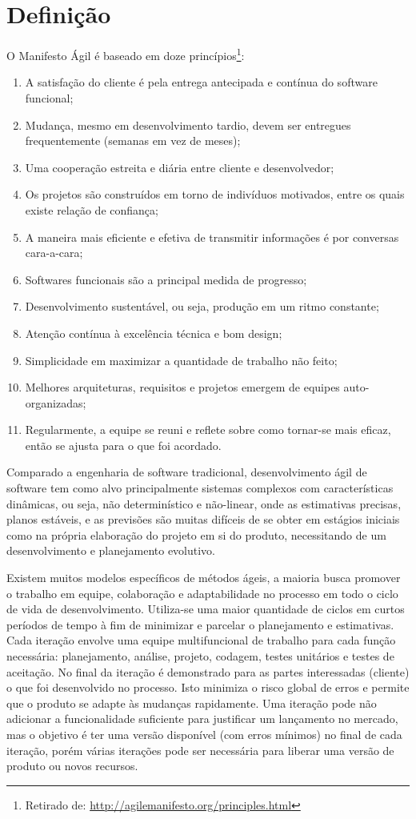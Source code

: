 \section{Definição}
\par O Manifesto Ágil é baseado em doze princípios\footnote{ Retirado de: \url{http://agilemanifesto.org/principles.html}}:
\begin{enumerate}
  \item A satisfação do cliente é pela entrega antecipada e contínua do software funcional;
  \item Mudança, mesmo em desenvolvimento tardio, devem ser entregues frequentemente (semanas em vez de meses);
  \item Uma cooperação estreita e diária entre cliente e desenvolvedor;
  \item Os projetos são construídos em torno de indivíduos motivados, entre os quais existe relação de confiança;
  \item A maneira mais eficiente e efetiva de transmitir informações é por conversas cara-a-cara;
  \item Softwares funcionais são a principal medida de progresso;
  \item Desenvolvimento sustentável, ou seja, produção em um ritmo constante;
  \item Atenção contínua à excelência técnica e bom design;
  \item Simplicidade em maximizar a quantidade de trabalho não feito;
  \item Melhores arquiteturas, requisitos e projetos emergem de equipes auto-organizadas;
  \item Regularmente, a equipe se reuni e reflete sobre como tornar-se mais eficaz, então se ajusta para o que foi acordado.
\end{enumerate}
\par Comparado a engenharia de software tradicional, desenvolvimento ágil de software tem como alvo principalmente sistemas complexos com características dinâmicas, ou seja, não determinístico e não-linear, onde as estimativas precisas, planos estáveis, e as previsões são muitas difíceis de se obter em estágios iniciais como na própria elaboração do projeto em si do produto, necessitando de um desenvolvimento e planejamento evolutivo.
\par Existem muitos modelos específicos de métodos ágeis, a maioria busca promover o trabalho em equipe, colaboração e adaptabilidade no processo em todo o ciclo de vida de desenvolvimento. Utiliza-se uma maior quantidade de ciclos em curtos períodos de tempo à fim de minimizar e parcelar o planejamento e estimativas. Cada iteração envolve uma equipe multifuncional de trabalho para cada função necessária: planejamento, análise, projeto, codagem, testes unitários e testes de aceitação. No final da iteração é demonstrado para as partes interessadas (cliente) o que foi desenvolvido no processo. Isto minimiza o risco global de erros e permite que o produto se adapte às mudanças rapidamente. Uma iteração pode não adicionar a funcionalidade suficiente para justificar um lançamento no mercado, mas o objetivo é ter uma versão disponível (com erros mínimos) no final de cada iteração, porém várias iterações pode ser necessária para liberar uma versão de produto ou novos recursos.
